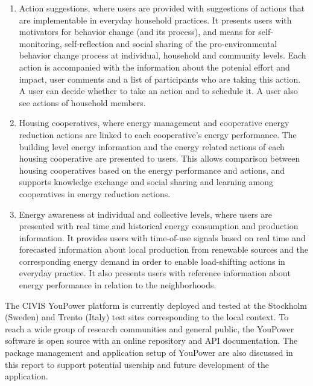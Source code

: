 \begin{enumerate}
\item Action suggestions, where users are provided with suggestions of actions that are implementable in everyday household practices. 
% 
It presents users with motivators for behavior change (and its process), and means for self-monitoring, self-reflection and social sharing of the pro-environmental behavior change process at individual, household and community levels. 
Each action is accompanied with the information about the potenial effort and impact, user comments and a list of participants who are taking this action. A user can decide whether to take an action and to schedule it. A user also see actions of household members. 

\item Housing cooperatives, where energy management and cooperative energy reduction actions are linked to each cooperative's energy performance. 
% 
The building level energy information and the energy related actions of each housing cooperative are presented to users. This allows comparison between housing cooperatives based on the energy performance and actions, and supports knowledge exchange and social sharing and learning among cooperatives in energy reduction actions.

\item Energy awareness at individual and collective levels, where users are presented with real time and historical energy consumption and production information. 
% 
It provides users with time-of-use signals based on real time and forecasted information about local production from renewable sources and the corresponding energy demand in order to enable load-shifting actions in everyday practice. It also presents users with reference information about energy performance in relation to the neighborhoods. 

\end{enumerate}

The CIVIS YouPower platform is currently deployed and tested at the Stockholm (Sweden) and Trento (Italy)
test sites corresponding to the local context. To reach a wide group of research communities and general public, the YouPower software is open source with an online repository and API documentation. The package management and application setup of YouPower are also discussed in this report to support potential usership and future development of the application. 

\newpage